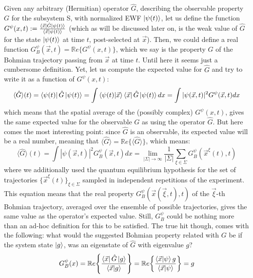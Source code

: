 \documentclass[11pt, a4paper]{article} %
\begin{document}
Given any arbitrary (Hermitian) operator $\hat{G}$, describing the observable property $G$ for the subsystem S, with normalized EWF $\ket{\psi(t)}$, let us define the function $G^{\psi}(x,t):=\frac{\bra{\vec{x}}\hat{G}\ket{\psi(t)}}{\bra{\vec{x}}\ket{\psi(t)}}$ (which as will be discussed later on, is the weak value \cite{Weak} of $\hat{G}$ for the state $\ket{\psi(t)}$ at time $t$, post-selected at $\vec{x}$). Then, we could define a real function $G_B^\psi(\vec{x},t)=\mathbb{R}e\{G^{\psi}(x,t)\}$, which we say is the property $G$ of the Bohmian trajectory passing from $\vec{x}$ at time $t$. Until here it seems just a cumbersome definition. Yet, let us compute the expected value for $\hat{G}$ and try to write it as a function of $G^\psi(x,t)$:
\begin{equation}
\langle \hat{G}\rangle(t)= \bra{\psi(t)}\hat{G}\ket{\psi(t)}=\int \bra{\psi(t)} \ket{\vec{x}}\bra{\vec{x}}\hat{G}\ket{\psi(t)}dx =  \int |\psi(\vec{x},t)|^2G^\psi(\vec{x},t)dx
\end{equation}
which means that the spatial average of the (possibly complex) $G^\psi(x,t)$, gives the same expected value for the observable $G$ as using the operator $\hat{G}$. But here comes the most interesting point: since $\hat{G}$ is an observable, its expected value will be a real number, meaning that $\langle \hat{G}\rangle=\mathbb{R}e\{\langle \hat{G}\rangle\}$, which means:
\begin{equation}
\langle \hat{G}\rangle(t)=\int |\psi(\vec{x},t)|^2G_B^\psi(\vec{x},t)dx= \lim_{|\Sigma|\rightarrow \infty}\frac{1}{|\Sigma|} \sum_{\xi\in\Sigma} G_B^\psi(\vec{x}^\xi(t),t)
\end{equation}
where we additionally used the quantum equilibrium hypothesis \cite{Absolute} for the set of trajectories $\{\vec{x}^\xi(t)\}_{\xi\in\Sigma}$ sampled in independent repetitions of the experiment. This equation means that the real property $G_B^\psi(\vec{x}(\vec{\xi},t),t)$ of the $\vec{\xi}$-th Bohmian trajectory, averaged over the ensemble of possible trajectories, gives the same value as the operator's expected value. Still, $G^\psi_B$ could be nothing more than an ad-hoc definition for this to be satisfied. The true hit though, comes with the following: what would the suggested Bohmian property related with $G$ be if the system state $\ket{g}$, was an eigenstate of $\hat{G}$ with eigenvalue $g$?
\begin{equation}
G_B^\psi(x)=\mathbb{R}e\qty{ \frac{\bra{\vec{x}}\hat{G}\ket{g}}{\bra{\vec{x}}\ket{g}} } = \mathbb{R}e\qty{ \frac{\bra{\vec{x}}\ket{\psi}g}{\bra{\vec{x}}\ket{\psi}} }=g
\end{equation}
\end{document}
